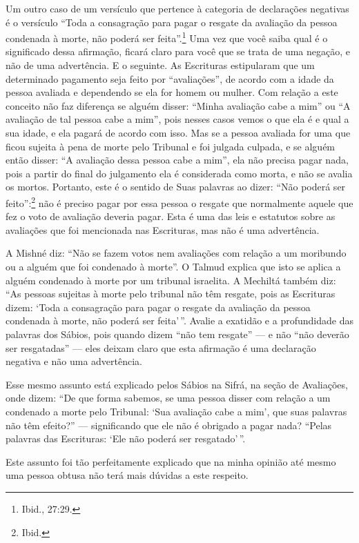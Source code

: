 Um outro caso de um versículo que pertence à categoria de declarações
negativas é o versículo ``Toda a consagração para pagar o resgate da
avaliação da pessoa condenada à morte, não poderá ser feita''.\footnote{Ibid.,
27:29.} Uma vez que você saiba qual é o significado dessa afirmação,
ficará claro para você que se trata de uma negação, e não de uma
advertência. E o seguinte. As Escrituras estipularam que um determinado
pagamento seja feito por ``avaliações'', de acordo com a idade da pessoa
avaliada e dependendo se ela for homem ou mulher. Com relação a este
conceito não faz diferença se alguém disser: ``Minha avaliação cabe a
mim'' ou ``A avaliação de tal pessoa cabe a mim'', pois nesses casos
vemos o que ela é e qual a sua idade, e ela pagará de acordo com isso.
Mas se a pessoa avaliada for uma que ficou sujeita à pena de morte pelo
Tribunal e foi julgada culpada, e se alguém então disser: ``A avaliação
dessa pessoa cabe a mim'', ela não precisa pagar nada, pois a partir do
final do julgamento ela é considerada como morta, e não se avalia os
mortos. Portanto, este é o sentido de Suas palavras ao dizer: ``Não
poderá ser feito'':\footnote{Ibid.} não é preciso pagar por essa pessoa o
resgate que normalmente aquele que fez o voto de avaliação deveria
pagar. Esta é uma das leis e estatutos sobre as avaliações que foi
mencionada nas Escrituras, mas não é uma advertência.

A Mishné diz: ``Não se fazem votos nem avaliações com relação a um
moribundo ou a alguém que foi condenado à morte''. O Talmud\starr{} explica que
isto se aplica a alguém condenado à morte por um tribunal israelita. A
Mechiltá\starr{} também diz: ``As pessoas sujeitas à morte pelo tribunal não têm
resgate, pois as Escrituras dizem: `Toda a consagração para pagar o
resgate da avaliação da pessoa condenada à morte, não poderá ser
feita'\,''. Avalie a exatidão e a profundidade das palavras dos Sábios,
pois quando dizem ``não tem resgate'' --- e não ``não deverão ser
resgatadas'' --- eles deixam claro que esta afirmação é uma declaração
negativa e não uma advertência.

Esse mesmo assunto está explicado pelos Sábios na Sifrá\starr, na seção de
Avaliações, onde dizem: ``De que forma sabemos, se uma pessoa disser com
relação a um condenado a morte pelo Tribunal: `Sua avaliação cabe a
mim', que suas palavras não têm efeito?'' --- significando que ele não é
obrigado a pagar nada? ``Pelas palavras das Escrituras: `Ele não poderá
ser resgatado'\,''.

Este assunto foi tão perfeitamente explicado que na minha opinião até
mesmo uma pessoa obtusa não terá mais dúvidas a este respeito.

